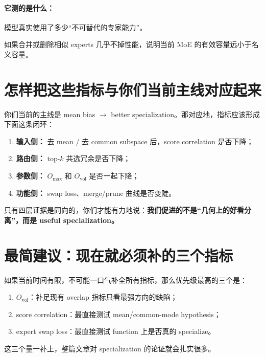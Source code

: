 \documentclass[11pt]{article}
\begin{document}
\paragraph{它测的是什么：}
模型真实使用了多少“不可替代的专家能力”。

如果合并或删除相似 experts 几乎不掉性能，说明当前 MoE 的有效容量远小于名义容量。

\section{怎样把这些指标与你们当前主线对应起来}

你们当前的主线是 mean bias $\rightarrow$ better specialization。那对应地，指标应该形成下面这条闭环：
\begin{enumerate}
    \item \textbf{输入侧：} 去 mean / 去 common subspace 后，score correlation 是否下降；
    \item \textbf{路由侧：} top-$k$ 共选冗余是否下降；
    \item \textbf{参数侧：} $O_{\max}$ 和 $O_{\mathrm{vol}}$ 是否一起下降；
    \item \textbf{功能侧：} swap loss、merge/prune 曲线是否变陡。
\end{enumerate}

只有四层证据是同向的，你们才能有力地说：\textbf{我们促进的不是“几何上的好看分离”，而是 useful specialization。}

\section{最简建议：现在就必须补的三个指标}
如果当前时间有限，不可能一口气补全所有指标，那么优先级最高的三个是：
\begin{enumerate}
    \item $O_{\mathrm{vol}}$：补足现有 overlap 指标只看最强方向的缺陷；
    \item score correlation：最直接测试 mean/common-mode hypothesis；
    \item expert swap loss：最直接测试 function 上是否真的 specialize。
\end{enumerate}

这三个量一补上，整篇文章对 specialization 的论证就会扎实很多。
\end{document}
